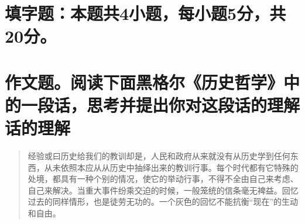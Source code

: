 \documentclass[answer=true,countunit=chapter,sheetsize=A4,paperprint=double,scoretable]{simplexam}
\begin{document}
%


\chapter{填字题：本题共4小题，每小题5分，共20分。}






\chapter{作文题。阅读下面黑格尔《历史哲学》中的一段话，思考并提出你对这段话的理解话的理解}


\begin{question}
\begin{quotation}
  \large \kaishu 经验或曰历史给我们的教训却是，人民和政府从来就没有从历史学到任何东西，从未依照本应从从历史中抽绎出来的教训行事。每个时代都有它特殊的处境，都具有一种个别的情况，使它的举动行事，不得不全由自己来考虑、自己来解决。当重大事件纷乘交迫的时候，一般笼统的信条毫无裨益。回忆过去的同样情形，也是徒劳无功的。一个灰色的回忆不能抗衡``现在''的生动和自由。
\end{quotation}
\answerpoints
\end{question}

%
\end{document}
